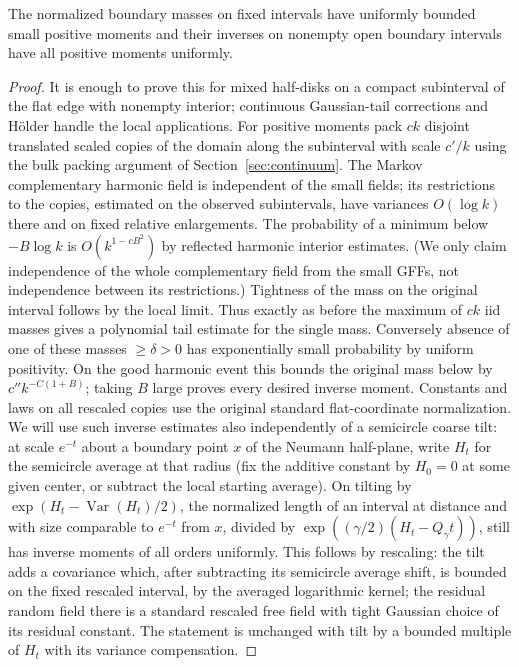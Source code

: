 \begin{lemma}\label{proxy:boundary-moments}
The normalized boundary masses on fixed intervals have uniformly bounded small positive moments and their inverses on nonempty open boundary intervals have all positive moments uniformly. \end{lemma}\begin{proof}
It is enough to prove this for mixed half-disks on a compact subinterval of the flat edge with nonempty interior; continuous Gaussian-tail corrections and Hölder handle the local applications.
For positive moments pack \(c k\) disjoint translated scaled copies of the domain along the subinterval with scale \(c'/k\) using the bulk packing argument of Section~\ref{sec:continuum}.
The Markov complementary harmonic field is independent of the small fields; its restrictions to the copies, estimated on the observed subintervals, have variances \(O(\log k)\) there and on fixed relative enlargements.
The probability of a minimum below \(-B\log k\) is \(O(k^{1-cB^2})\) by reflected harmonic interior estimates. (We only claim independence of the whole complementary field from the small GFFs, not independence between its restrictions.) Tightness of the mass on the original interval follows by the local limit.
Thus exactly as before the maximum of \(c k\) iid masses gives a polynomial tail estimate for the single mass.
Conversely absence of one of these masses \(\ge\delta>0\) has exponentially small probability by uniform positivity.
On the good harmonic event this bounds the original mass below by \(c'' k^{-C(1+B)}\); taking \(B\) large proves every desired inverse moment.
Constants and laws on all rescaled copies use the original standard flat-coordinate normalization.
We will use such inverse estimates also independently of a semicircle coarse tilt: at scale \(e^{-t}\) about a boundary point \(x\) of the Neumann half-plane, write \(H_t\) for the semicircle average at that radius (fix the additive constant by \(H_0=0\) at some given center, or subtract the local starting average).
On tilting by \(\exp(H_t-\operatorname{Var}(H_t)/2)\), the normalized length of an interval at distance and with size comparable to \(e^{-t}\) from \(x\), divided by \(\exp((\gamma/2)(H_t-Q_\gamma t))\), still has inverse moments of all orders uniformly.
This follows by rescaling: the tilt adds a covariance which, after subtracting its semicircle average shift, is bounded on the fixed rescaled interval, by the averaged logarithmic kernel; the residual random field there is a standard rescaled free field with tight Gaussian choice of its residual constant.
The statement is unchanged with tilt by a bounded multiple of \(H_t\) with its variance compensation.
\end{proof}

